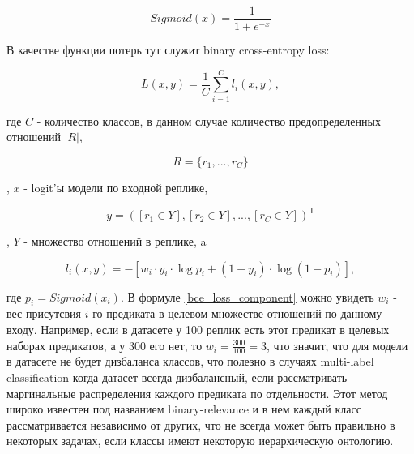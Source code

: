 \begin{equation}\label{sigmoid}
    Sigmoid(x) = \frac{1}{1 + e^{-x}}
\end{equation}

В качестве функции потерь тут служит binary cross-entropy loss:

\begin{equation}\label{bce_loss}
    L(x,y) = \frac{1}{C} \sum^{C}_{i=1}{l_i(x, y)},
\end{equation}

где $C$ - количество классов, в данном случае количество предопределенных отношений $|R|$, 

\begin{equation}\label{relation_set}
    R=\{r_1,...,r_C\}
\end{equation}

, $x$ - logit'ы модели по входной реплике, 

\begin{equation}\label{target_indicator}
    y = ([r_1 \in Y], [r_2 \in Y], ..., [r_C \in Y])^\mathsf{T}
\end{equation}

, $Y$ - множество отношений в реплике, a

\begin{equation}\label{bce_loss_component}
    l_i(x, y) = -[w_i \cdotp y_i \cdotp \log{p_i} + (1 - y_i) \cdotp \log{(1 - p_i)}],
\end{equation}

где $p_i = Sigmoid(x_i)$. В формуле \ref{bce_loss_component} можно увидеть $w_i$ - вес присутсвия $i$-го предиката в целевом множестве отношений по данному входу. Например, если в датасете у 100 реплик есть этот предикат в целевых наборах предикатов, а у 300 его нет, то $w_i = \frac{300}{100} = 3$, что значит, что для модели в датасете не будет дизбаланса классов, что полезно в случаях multi-label classification когда датасет всегда дизбалансный, если рассматривать маргинальные распределения каждого предиката по отдельности. Этот метод широко известен под названием binary-relevance \cite{binary_relevance} и в нем каждый класс рассматривается независимо от других, что не всегда может быть правильно в некоторых задачах, если классы имеют некоторую иерархическую онтологию.

